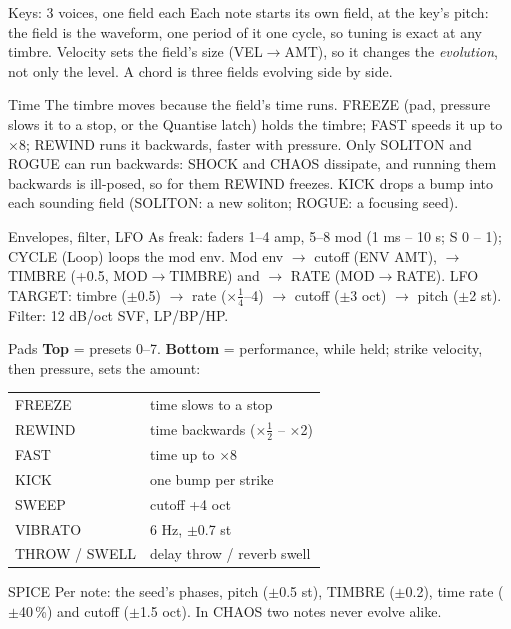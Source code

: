 \documentclass{article}
\newcommand{\FX}[1]{\textcolor{fxc}{#1}}
\newcommand{\FD}[1]{\textcolor{fdc}{#1}}
\newcommand{\EN}[1]{\textcolor{engc}{#1}}
\begin{document}
\begin{minipage}[t]{62mm}\vspace{0pt}
\begin{card}{Keys: 3 voices, one field each}
Each note starts its own field, at the key's pitch: the field is the waveform, one period of it one cycle,
so tuning is exact at any timbre. Velocity sets the field's size (VEL\(\to\)AMT), so it changes the
\emph{evolution}, not only the level. A chord is three fields evolving side by side.
\end{card}
\begin{card}{Time}
The timbre moves because the field's time runs. \FD{FREEZE} (pad, pressure slows it to a stop, or the
Quantise latch) holds the timbre; \FD{FAST} speeds it up to \(\times\)8; \FD{REWIND} runs it backwards,
faster with pressure. Only SOLITON and ROGUE can run backwards: SHOCK and CHAOS dissipate, and running
them backwards is ill-posed, so for them REWIND freezes. \FD{KICK} drops a bump into each sounding field
(SOLITON: a new soliton; ROGUE: a focusing seed).
\end{card}
\begin{card}{Envelopes, filter, LFO}
As freak: faders 1--4 amp, 5--8 mod (1 ms -- 10 s; S 0 -- 1); CYCLE (Loop) loops the mod env. Mod env
\(\to\) cutoff (ENV AMT), \(\to\) TIMBRE (+0.5, MOD\(\to\)TIMBRE) and \(\to\) RATE (MOD\(\to\)RATE). LFO
TARGET: \EN{timbre} (\(\pm\)0.5) \(\to\) \FD{rate} (\(\times\frac14\)--4) \(\to\) cutoff (\(\pm\)3 oct) \(\to\) pitch
(\(\pm\)2 st). Filter: 12 dB/oct SVF, LP/BP/HP.
\end{card}
\end{minipage}\hfill
\begin{minipage}[t]{56mm}\vspace{0pt}
\begin{card}{Pads}
\textbf{Top} = presets 0--7. \textbf{Bottom} = performance, while held; strike velocity, then
pressure, sets the amount:
\fontsize{6.6}{7.9}\selectfont
\begin{tabularx}{\linewidth}{@{}l L@{}}
\FD{FREEZE} & time slows to a stop \\
\FD{REWIND} & time backwards (\(\times\frac12\) -- \(\times\)2) \\
\FD{FAST} & time up to \(\times\)8 \\
\FD{KICK} & one bump per strike \\
SWEEP & cutoff +4 oct \\
VIBRATO & 6 Hz, \(\pm\)0.7 st \\
\FX{THROW / SWELL} & delay throw / reverb swell \\
\end{tabularx}
\end{card}
\begin{card}{SPICE}
Per note: the seed's phases, pitch (\(\pm\)0.5 st), TIMBRE (\(\pm\)0.2), time rate (\(\pm\)40\,\%) and cutoff
(\(\pm\)1.5 oct). In CHAOS two notes never evolve alike.
\end{card}
\end{minipage}\hfill
\end{document}
